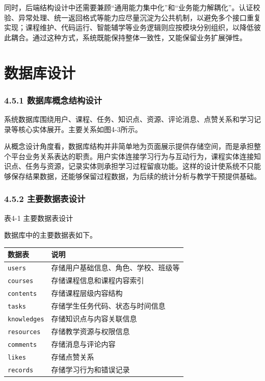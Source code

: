 同时，后端结构设计中还需要兼顾``通用能力集中化''和``业务能力解耦化''。认证校验、异常处理、统一返回格式等能力应尽量沉淀为公共机制，以避免多个接口重复实现；课程维护、代码运行、智能辅学等业务逻辑则应按模块分别组织，以降低彼此耦合。通过这种方式，系统既能保持整体一致性，又能保留业务扩展弹性。

\section{数据库设计}\label{ux6570ux636eux5e93ux8bbeux8ba1}

\subsubsection{4.5.1 数据库概念结构设计}\label{ux6570ux636eux5e93ux6982ux5ff5ux7ed3ux6784ux8bbeux8ba1}

系统数据库围绕用户、课程、任务、知识点、资源、评论消息、点赞关系和学习记录等核心实体展开。主要关系如图4-3所示。

\tikzDatabaseConceptFigure

从概念设计角度看，数据库结构并非简单地为页面展示提供存储空间，而是承担整个平台业务关系表达的职责。用户实体连接学习行为与互动行为，课程实体连接知识点、任务与资源，记录实体则承担学习过程留痕功能。这样的设计使系统不只能够保存结果数据，还能够保留过程数据，为后续的统计分析与教学干预提供基础。

\subsubsection{4.5.2 主要数据表设计}\label{ux4e3bux8981ux6570ux636eux8868ux8bbeux8ba1}

表4-1 主要数据表设计

数据库中的主要数据表如下。

\begin{longtable}[]{@{}ll@{}}
\toprule\noalign{}
数据表 & 说明 \\
\midrule\noalign{}
\endhead
\bottomrule\noalign{}
\endlastfoot
\texttt{users} & 存储用户基础信息、角色、学校、班级等 \\
\texttt{courses} & 存储课程信息和课程内容索引 \\
\texttt{contents} & 存储课程层级内容结构 \\
\texttt{tasks} & 存储学生任务代码、状态与时间信息 \\
\texttt{knowledges} & 存储知识点与内容关联信息 \\
\texttt{resources} & 存储教学资源与权限信息 \\
\texttt{comments} & 存储消息与评论内容 \\
\texttt{likes} & 存储点赞关系 \\
\texttt{records} & 存储学习行为和错误记录 \\
\end{longtable}

